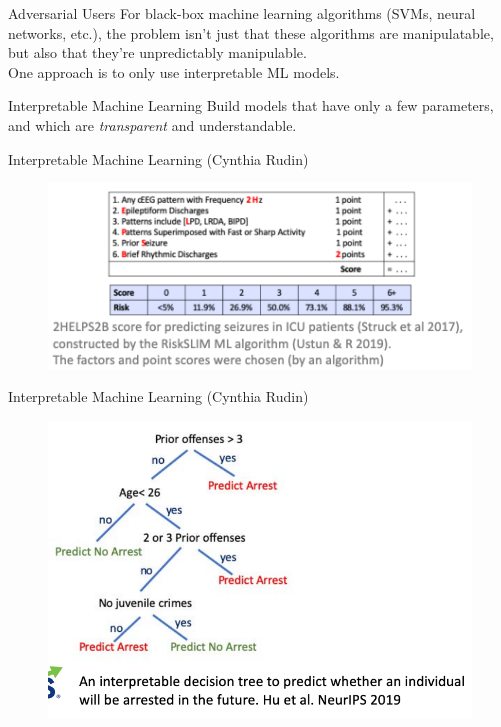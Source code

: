 \documentclass[11pt,handout]{beamer}
\begin{document}
\begin{frame}[c]{Adversarial Users}
  For black-box machine learning algorithms (SVMs, neural networks, etc.), the problem isn't just that these algorithms are manipulatable, \pause but also that they're \alert{unpredictably} manipulable.\\
  \vspace{0.1cm}
  \pause One approach is to only use \alert{interpretable ML models.}
\end{frame}

\begin{frame}[c]{Interpretable Machine Learning}
  \pause Build models that have only a few parameters, and which are \emph{transparent} and understandable.
\end{frame}

\begin{frame}[c]{Interpretable Machine Learning (Cynthia Rudin)}
\begin{figure}
  \includegraphics[width=\textwidth]{images/rudin_model.png}
\end{figure}
\end{frame}

\begin{frame}[c]{Interpretable Machine Learning (Cynthia Rudin)}
\begin{figure}
  \includegraphics[width=\textwidth]{images/rudin_model_2.png}
\end{figure}
\end{frame}
\end{document}
